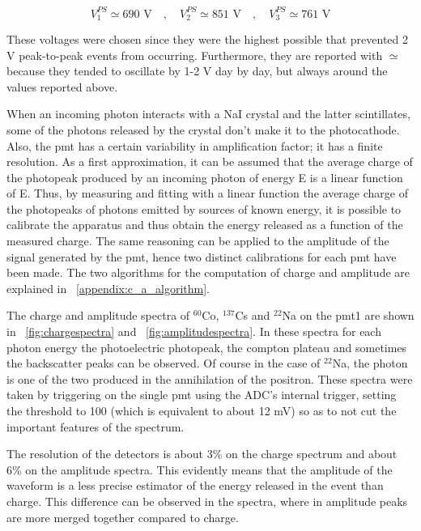 \documentclass[10pt,a4paper,twocolumn]{article}
\begin{document}
\begin{equation}
    V^{PS}_{1}\simeq 690 \text{ V}\quad , \quad V^{PS}_{2} \simeq 851 \text{ V} \quad , \quad V^{PS}_{3} \simeq 761 \text{ V}
\end{equation}  

These voltages were chosen since they were the highest possible that prevented 2 V peak-to-peak events from occurring. Furthermore, they are reported with $\simeq$ because they tended to oscillate by 1-2 V day by day, but always around the values reported above.

When an incoming photon interacts with a NaI crystal and the latter scintillates, some of the photons released by the crystal don't make it to the photocathode. Also, the pmt has a certain variability in amplification factor; it has a finite resolution. As a first approximation, it can be assumed that the average charge of the photopeak produced by an incoming photon of energy E is a linear function of E. Thus, by measuring and fitting with a linear function the average charge of the photopeaks of photons emitted by sources of known energy, it is possible to calibrate the apparatus and thus obtain the energy released as a function of the measured charge. The same reasoning can be applied to the amplitude of the signal generated by the pmt, hence  two distinct calibrations for each pmt have been made. The two algorithms for the computation of charge and amplitude are explained in \appendixname~\ref{appendix:c_a_algorithm}.


The charge and amplitude spectra of $^{60}$Co, $^{137}$Cs and $^{22}$Na on the pmt1 are shown in \figurename~\ref{fig:chargespectra} and \figurename~\ref{fig:amplitudespectra}. In these spectra for each photon energy the photoelectric photopeak, the compton plateau and sometimes the backscatter peaks can be observed. Of course in the case of $^{22}$Na, the photon is one of the two produced in the annihilation of the positron. These spectra were taken by triggering on the single pmt using the ADC's internal trigger, setting the threshold to 100 (which is equivalent to about 12 mV) so as to not cut the important features of the spectrum.

The resolution of the detectors is about 3\% on the charge spectrum and about 6\% on the amplitude spectra. This evidently means that the amplitude of the waveform is a less precise estimator of the energy released in the event than charge. This difference can be observed in the spectra, where in amplitude peaks are more merged together compared to charge. 
\end{document}
